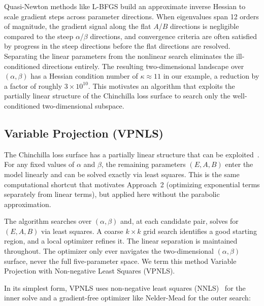\documentclass[11pt]{article}
\begin{document}
Quasi-Newton methods like L-BFGS build an approximate inverse Hessian to scale
gradient
steps across parameter directions. When eigenvalues span 12 orders of
magnitude, the gradient signal along the flat $A$/$B$ directions is negligible
compared to the steep $\alpha$/$\beta$ directions, and convergence criteria are
often satisfied by progress in the steep directions before the flat directions
are resolved. Separating the linear parameters from the nonlinear search
eliminates the ill-conditioned directions entirely. The resulting
two-dimensional landscape over $(\alpha, \beta)$ has a Hessian condition number
of $\kappa \approx 11$ in our example, a reduction by a factor of roughly
$3 \times 10^{10}$. This motivates an algorithm that exploits the partially
linear structure of the Chinchilla loss surface to search only the
well-conditioned two-dimensional subspace.

\subsection{Variable Projection (VPNLS)}
\label{sec:vpnls_method}

The Chinchilla loss surface has a partially linear structure that can be
exploited~\citep{variable_projection}. For any fixed values of $\alpha$ and $\beta$, the remaining
parameters $(E, A, B)$ enter the model linearly and can be solved exactly via
least squares. This is the same computational shortcut that motivates
Approach~2 (optimizing exponential terms separately from linear terms), but
applied here without the parabolic approximation.

The algorithm searches over $(\alpha, \beta)$ and, at each candidate pair,
solves for $(E, A, B)$ via least squares. A coarse $k \times k$ grid search
identifies a good starting region, and a local optimizer refines it. The
linear separation is maintained throughout. The optimizer only ever navigates
the two-dimensional $(\alpha, \beta)$ surface, never the full five-parameter
space. We term this method Variable Projection with Non-negative Least Squares
(VPNLS).

In its simplest form, VPNLS uses non-negative least squares (NNLS)~\citep{nnls} for the
inner solve and a gradient-free optimizer like Nelder-Mead for the outer
search:
\end{document}
